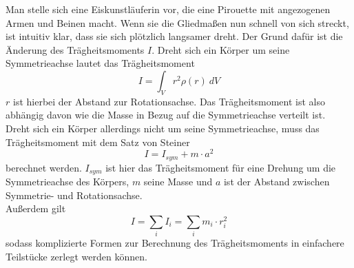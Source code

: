 Man stelle sich eine Eiskunstläuferin vor, die eine Pirouette mit angezogenen Armen und Beinen macht. Wenn sie die Gliedmaßen nun schnell von sich streckt, ist intuitiv klar, dass sie sich plötzlich langsamer dreht. Der Grund dafür ist die Änderung des Trägheitsmoments $I$. Dreht sich ein Körper um seine Symmetrieachse lautet das Trägheitsmoment
\begin{equation}
	I = \int_V r^2\rho(r)\ dV
\end{equation}
$r$ ist hierbei der Abstand zur Rotationsachse. Das Trägheitsmoment ist also abhängig davon wie die Masse in Bezug auf die Symmetrieachse verteilt ist. \\


Dreht sich ein Körper allerdings nicht um seine Symmetrieachse, muss das Trägheitsmoment mit dem Satz von Steiner
\begin{equation}
	I = I_{sym} + m\cdot a^2
	\label{eq: Steiner}
\end{equation}
berechnet werden. $I_{sym}$ ist hier das Trägheitsmoment für eine Drehung um die Symmetrieachse des Körpers, $m$ seine Masse und $a$ ist der Abstand zwischen Symmetrie- und Rotationsachse. \\
Außerdem gilt
\begin{equation}
	I = \sum_i I_i = \sum_i m_i\cdot r_i^2
\end{equation}
sodass komplizierte Formen zur Berechnung des Trägheitsmoments in einfachere Teilstücke zerlegt werden können. \\


